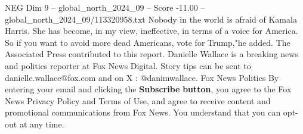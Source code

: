 \begin{textsample}{NEG Dim 9 – global\_north\_2024\_09 – Score -11.00 – global\_north\_2024\_09/113320958.txt}
Nobody in the world is afraid of Kamala Harris.
She has become, in my view, ineffective, in terms of a voice for America.
So if you want to avoid more dead Americans, vote for Trump,"he added.
The Associated Press contributed to this report.
Danielle Wallace is a breaking news and politics reporter at Fox News Digital.
Story tips can be sent to danielle.wallace@fox.com and on X : @danimwallace.
Fox News Politics By entering your email and clicking the \textbf{Subscribe} \textbf{button}, you agree to the Fox News Privacy Policy and Terms of Use, and agree to receive content and promotional communications from Fox News.
You understand that you can opt-out at any time.

\end{textsample}
